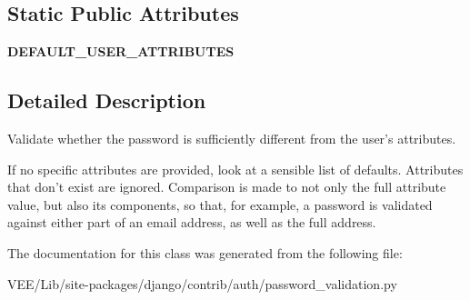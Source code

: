 \subsection*{Static Public Attributes}
\begin{DoxyCompactItemize}
\item 
\mbox{\label{classdjango_1_1contrib_1_1auth_1_1password__validation_1_1_user_attribute_similarity_validator_a3507f7b8198e57a2b83f358232d12c12}} 
{\bfseries D\+E\+F\+A\+U\+L\+T\+\_\+\+U\+S\+E\+R\+\_\+\+A\+T\+T\+R\+I\+B\+U\+T\+ES}
\end{DoxyCompactItemize}


\subsection{Detailed Description}
\begin{DoxyVerb}Validate whether the password is sufficiently different from the user's
attributes.

If no specific attributes are provided, look at a sensible list of
defaults. Attributes that don't exist are ignored. Comparison is made to
not only the full attribute value, but also its components, so that, for
example, a password is validated against either part of an email address,
as well as the full address.
\end{DoxyVerb}
 

The documentation for this class was generated from the following file\+:\begin{DoxyCompactItemize}
\item 
V\+E\+E/\+Lib/site-\/packages/django/contrib/auth/password\+\_\+validation.\+py\end{DoxyCompactItemize}
